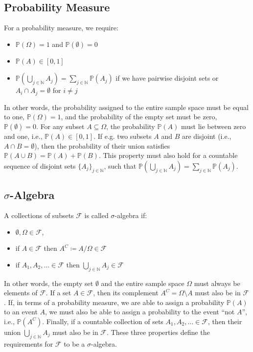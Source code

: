 \subsection{Probability Measure}
For a probability measure, we require:
\begin{itemize}
	\item $\mathbb{P}(\Omega) = 1$ and $\mathbb{P}(\emptyset) = 0$
	\item $\mathbb{P}(A) \in [0,1]$
	\item $\mathbb{P}(\bigcup_{j \in \mathbb{N}} A_j )= \sum_{j \in \mathbb{N}}  \mathbb{P}(A_j)$ if we have pairwise disjoint sets or $A_i \cap A_j = \emptyset$ for $i \neq j $
\end{itemize}
In other words, the probability assigned to the entire sample space must be equal to one, $\mathbb{P}(\Omega) = 1$, and the probability of the empty set must be zero, $\mathbb{P}(\emptyset) = 0$. For any subset $A \subseteq \Omega$, the probability $\mathbb{P}(A)$ must lie between zero and one, i.e., $\mathbb{P}(A) \in [0,1]$.
If e.g. two subsets $A$ and $B$ are disjoint (i.e., $A \cap B = \emptyset$), then the probability of their union satisfies $\mathbb{P}(A \cup B) = \mathbb{P}(A) + \mathbb{P}(B)$.
This property must also hold for a countable sequence of disjoint sets $\{A_j\}_{j \in \mathbb{N}}$, such that $\mathbb{P}\left( \bigcup_{j \in \mathbb{N}} A_j \right) = \sum_{j \in \mathbb{N}} \mathbb{P}(A_j)$.

\subsection{$\sigma$-Algebra}
A collections of subsets $\mathcal{F}$ is called $\sigma$-algebra if:
\begin{itemize}
	\item $\emptyset, \Omega \in \mathcal{F} $,
	\item if $A \in \mathcal{F} $ then $A^C \coloneqq A / \Omega \in \mathcal{F}$
	\item if $A_1 , A_2, \dots  \in \mathcal{F} $ then $ \bigcup_{j \in \mathbb{N}}  A_j \in  \mathcal{F}$
\end{itemize}
In other words, the empty set $\emptyset$ and the entire sample space $\Omega$ must always be elements of $\mathcal{F}$. If a set $A \in \mathcal{F}$, then its complement $A^C = \Omega \setminus A$ must also be in $\mathcal{F}$. 
If, in terms of a probability measure, we are able to assign a probability $\mathbb{P}(A)$ to an event $A$, we must also be able to assign a probability to the event “not $A$”, i.e., $\mathbb{P}(A^C)$.
Finally, if a countable collection of sets $A_1, A_2, \dots \in \mathcal{F}$, then their union $\bigcup_{j \in \mathbb{N}} A_j$ must also be in $\mathcal{F}$. These three properties define the requirements for $\mathcal{F}$ to be a $\sigma$-algebra.

